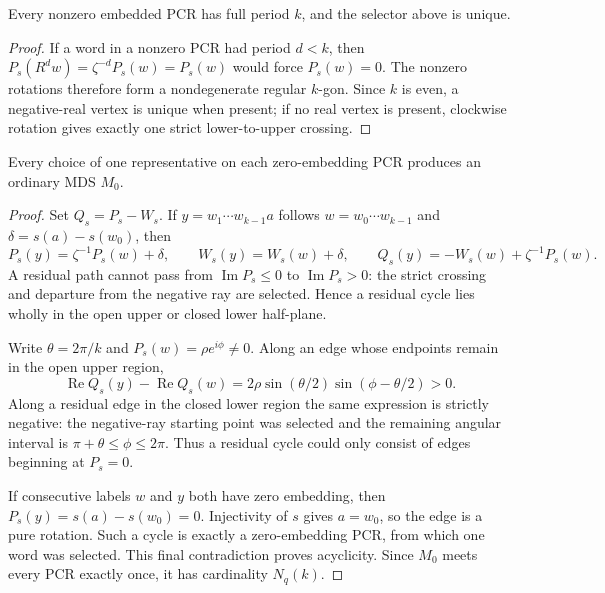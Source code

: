 \begin{lemma}
\label{lem:selector-unique}
Every nonzero embedded PCR has full period $k$, and the selector above is
unique.
\end{lemma}

\begin{proof}
If a word in a nonzero PCR had period $d<k$, then
$P_s(R^dw)=\zeta^{-d}P_s(w)=P_s(w)$ would force $P_s(w)=0$.  The nonzero
rotations therefore form a nondegenerate regular $k$-gon.  Since $k$ is
even, a negative-real vertex is unique when present; if no real vertex is
present, clockwise rotation gives exactly one strict lower-to-upper crossing.
\end{proof}

\begin{theorem}
\label{thm:arbitrary-zero}
Every choice of one representative on each zero-embedding PCR produces an
ordinary MDS $M_0$.
\end{theorem}

\begin{proof}
Set $Q_s=P_s-W_s$.  If
$y=w_1\cdots w_{k-1}a$ follows $w=w_0\cdots w_{k-1}$ and
$\delta=s(a)-s(w_0)$, then
\[
  P_s(y)=\zeta^{-1}P_s(w)+\delta,\qquad
  W_s(y)=W_s(w)+\delta,\qquad
  Q_s(y)=-W_s(w)+\zeta^{-1}P_s(w).
\]
A residual path cannot pass from $\operatorname{Im}P_s\leq0$ to
$\operatorname{Im}P_s>0$: the strict crossing and departure from the
negative ray are selected.  Hence a residual cycle lies wholly in the open
upper or closed lower half-plane.

Write $\theta=2\pi/k$ and $P_s(w)=\rho e^{i\phi}\neq0$.  Along an edge whose
endpoints remain in the open upper region,
\begin{equation}
  \operatorname{Re}Q_s(y)-\operatorname{Re}Q_s(w)
  =2\rho\sin(\theta/2)\sin(\phi-\theta/2)>0.
  \label{eq:q-monotone}
\end{equation}
Along a residual edge in the closed lower region the same expression is
strictly negative: the negative-ray starting point was selected and the
remaining angular interval is $\pi+\theta\leq\phi\leq2\pi$.  Thus a
residual cycle could only consist of edges beginning at $P_s=0$.

If consecutive labels $w$ and $y$ both have zero embedding, then
$P_s(y)=s(a)-s(w_0)=0$.  Injectivity of $s$ gives $a=w_0$, so the edge is a
pure rotation.  Such a cycle is exactly a zero-embedding PCR, from which one
word was selected.  This final contradiction proves acyclicity.  Since
$M_0$ meets every PCR exactly once, it has cardinality $N_q(k)$.
\end{proof}

